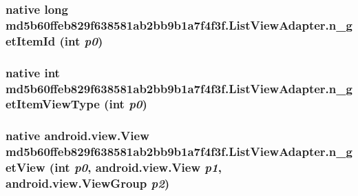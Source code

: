 \hypertarget{classmd5b60ffeb829f638581ab2bb9b1a7f4f3f_1_1_list_view_adapter_4d94a96e556f7fbc2b944ec3d5543f4b}{
\subsubsection[{n\_\-getItemId}]{\setlength{\rightskip}{0pt plus 5cm}native long md5b60ffeb829f638581ab2bb9b1a7f4f3f.ListViewAdapter.n\_\-getItemId (int {\em p0})}}
\label{classmd5b60ffeb829f638581ab2bb9b1a7f4f3f_1_1_list_view_adapter_4d94a96e556f7fbc2b944ec3d5543f4b}


\hypertarget{classmd5b60ffeb829f638581ab2bb9b1a7f4f3f_1_1_list_view_adapter_91846c130262b2cdd6b72561c12d2fde}{
\subsubsection[{n\_\-getItemViewType}]{\setlength{\rightskip}{0pt plus 5cm}native int md5b60ffeb829f638581ab2bb9b1a7f4f3f.ListViewAdapter.n\_\-getItemViewType (int {\em p0})}}
\label{classmd5b60ffeb829f638581ab2bb9b1a7f4f3f_1_1_list_view_adapter_91846c130262b2cdd6b72561c12d2fde}


\hypertarget{classmd5b60ffeb829f638581ab2bb9b1a7f4f3f_1_1_list_view_adapter_d3eaeb9cf406b61873fb7130c1899fcb}{
\subsubsection[{n\_\-getView}]{\setlength{\rightskip}{0pt plus 5cm}native android.view.View md5b60ffeb829f638581ab2bb9b1a7f4f3f.ListViewAdapter.n\_\-getView (int {\em p0}, \/  android.view.View {\em p1}, \/  android.view.ViewGroup {\em p2})}}
\label{classmd5b60ffeb829f638581ab2bb9b1a7f4f3f_1_1_list_view_adapter_d3eaeb9cf406b61873fb7130c1899fcb}


